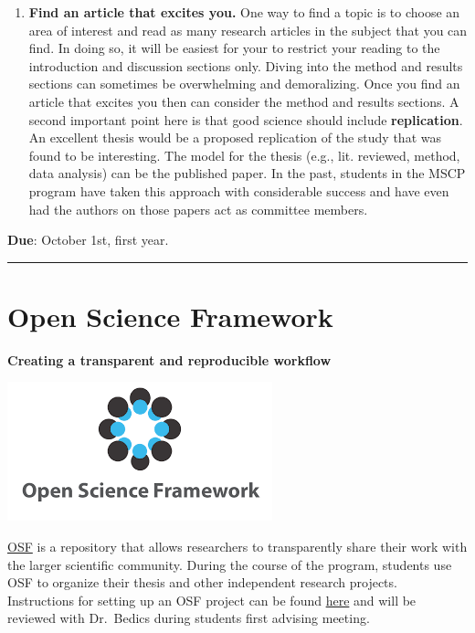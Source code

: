 \documentclass[openany]{book}
\begin{document}
\begin{enumerate}
\item
  \textbf{Find an article that excites you.} One way to find a topic is to choose an area of interest and read as many research articles in the subject that you can find. In doing so, it will be easiest for your to restrict your reading to the introduction and discussion sections only. Diving into the method and results sections can sometimes be overwhelming and demoralizing. Once you find an article that excites you then can consider the method and results sections. A second important point here is that good science should include \textbf{replication}. An excellent thesis would be a proposed replication of the study that was found to be interesting. The model for the thesis (e.g., lit. reviewed, method, data analysis) can be the published paper. In the past, students in the MSCP program have taken this approach with considerable success and have even had the authors on those papers act as committee members.
\end{enumerate}

\textbf{Due}: October 1st, first year.

\begin{center}\rule{0.5\linewidth}{0.5pt}\end{center}

\hypertarget{open-science-framework}{%
\section{Open Science Framework}\label{open-science-framework}}

\textbf{Creating a transparent and reproducible workflow}

\includegraphics{images/osf.png}

\href{https://accounts.osf.io/login?campaign=institution\&service=https\%3A\%2F\%2Fosf.io\%2Flogin\%2F\%3Fnext\%3Dhttps\%253A\%252F\%252Fosf.io\%252F}{OSF} is a repository that allows researchers to transparently share their work with the larger scientific community. During the course of the program, students use OSF to organize their thesis and other independent research projects. Instructions for setting up an OSF project can be found \href{https://speakerdeck.com/jdbedics/osf-setup-and-class-project-introduction}{here} and will be reviewed with Dr.~Bedics during students first advising meeting.
\end{document}
